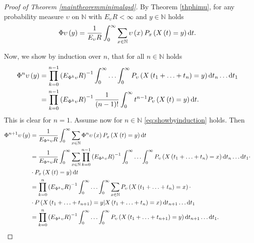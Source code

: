 \documentclass[12pt,a4paper]{scrartcl}
\numberwithin{equation}{section}
\newcommand{\N}{\mathbb{N}} %
\begin{document}
\begin{proof}[Proof of Theorem \ref{maintheoremminimalqsd}]
By Theorem \ref{thphimu}, for any probability measure $\upsilon$ on $\N$ with $E_{\upsilon} R < \infty$ and $y\in \N$ holds
$$ \Phi\upsilon\left(y\right) = \frac{1}{E_{\upsilon} R} \int_0^{\infty} \sum_{x \in \N} \upsilon\left(x\right) P_x\left(X\left(t\right) = y\right) \textnormal{d}t. $$

Now, we show by induction over $n$, that for all $n \in \N$ holds
\begin{equation}\label{eq:showbyinduction}
\begin{aligned}
\Phi^n\upsilon\left(y\right) &= \prod_{k=0}^{n-1} \left(E_{\Phi^k\upsilon} R\right)^{-1} \int_0^{\infty}\ldots \int_0^{\infty} P_{\upsilon}\left(X\left(t_1+\ldots+t_n\right)=y\right) \textnormal{d}t_n \ldots \textnormal{d}t_1 \\
&=\prod_{k=0}^{n-1} \left(E_{\Phi^k\upsilon} R\right)^{-1} \frac{1}{\left(n-1\right)!}\int_0^{\infty} t^{n-1} P_{\upsilon}\left(X\left(t\right)=y\right) \textnormal{d}t.
\end{aligned}
\end{equation}
This is clear for $n=1.$ Assume now for $n \in \N$ \eqref{eq:showbyinduction} holds.
Then
\begin{align*}
\Phi^{n+1}\upsilon\left(y\right) &= \frac{1}{E_{\Phi^n\upsilon}R} \int_0^{\infty} \sum_{x \in \N} \Phi^n\upsilon\left(x\right) P_x\left(X\left(t\right) = y\right) \textnormal{d}t \\
&=\frac{1}{E_{\Phi^n\upsilon}R} \int_0^{\infty} \sum_{x \in \N} \prod_{k=0}^{n-1} \left(E_{\Phi^k\upsilon} R\right)^{-1} \int_0^{\infty}\ldots \int_0^{\infty} P_{\upsilon}\left(X\left(t_1+\ldots+t_n\right)=x\right) \textnormal{d}t_n \ldots \textnormal{d}t_1 \cdot \\
& \cdot P_x\left(X\left(t\right)=y\right) \textnormal{d}t \\
&=\prod_{k=0}^{n} \left(E_{\Phi^k\upsilon} R\right)^{-1} \int_0^{\infty} \ldots \int_0^{\infty} \sum_{x \in \N} P_{\upsilon}\left(X\left(t_1+\ldots+t_n\right)=x\right) \cdot \\
& \cdot P\left(X\left(t_1+\ldots+t_{n+1}\right)=y | X\left(t_1+\ldots+t_n\right)=x \right) \textnormal{d}t_{n+1} \ldots \textnormal{d}t_1 \\
&= \prod_{k=0}^{n} \left(E_{\Phi^k\upsilon} R\right)^{-1} \int_0^{\infty}\ldots \int_0^{\infty} P_{\upsilon}\left(X\left(t_1+\ldots+t_{n+1}\right)=y\right) \textnormal{d}t_{n+1} \ldots \textnormal{d}t_1.
\end{align*}


\end{proof}
\end{document}
